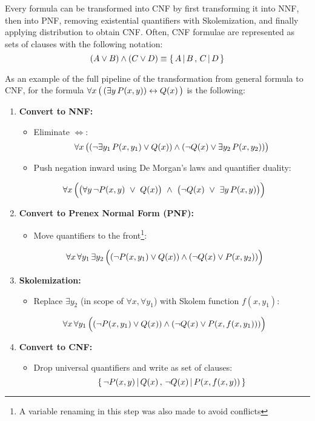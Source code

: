 Every formula can be transformed into CNF by first transforming it into NNF, then into PNF, removing existential quantifiers with Skolemization, and finally applying distribution to obtain CNF\@.
Often, CNF formulae are represented as sets of clauses with the following notation:
\[
(A \lor B) \land (C \lor D) \equiv \{\, A \,|\, B\,,\, C \,|\, D\,\}
\]

As an example of the full pipeline of the transformation from general formula to CNF, for the formula \( \forall x\,\big(\,(\exists y\, P(x,y)) \leftrightarrow Q(x)\,\big)\)
is the following:
\begin{enumerate}
    \item \textbf{Convert to NNF:}
    \begin{itemize}
        \item Eliminate \(\iff\):
          \[\forall x \,\big( (\neg \exists y_1\, P(x,y_1) \lor Q(x)) \land (\neg Q(x) \lor \exists y_2\, P(x,y_2))\big)\]
        \item Push negation inward using De Morgan's laws and quantifier duality:
    \end{itemize}
    \[
    \forall x\,\Big(\big(\forall y\,\neg P(x,y)\ \lor\ Q(x)\big)\ \land\ \big(\neg Q(x)\ \lor\ \exists y\, P(x,y)\big)\Big)
    \]
    
    \item \textbf{Convert to Prenex Normal Form (PNF):}
    \begin{itemize}
        \item Move quantifiers to the front\footnote{A variable renaming in this step was also made to avoid conflicts}:
    \end{itemize}
    \[
    \forall x\,\forall y_1\,\exists y_2\,
    \Big((\neg P(x,y_1)\lor Q(x)) \land (\neg Q(x)\lor P(x,y_2))\Big)
    \]
    
    \item \textbf{Skolemization:}
    \begin{itemize}
        \item Replace \(\exists y_2\) (in scope of \(\forall x,\forall y_1\)) with Skolem function \(f(x,y_1)\):
    \end{itemize}
    \[
    \forall x\,\forall y_1\,
    \Big((\neg P(x,y_1)\lor Q(x)) \land (\neg Q(x)\lor P(x,f(x,y_1)))\Big)
    \]
    
    \item \textbf{Convert to CNF:}
    \begin{itemize}
        \item Drop universal quantifiers and write as set of clauses:
        \[
          \{\,\neg P(x,y)\,|\, Q(x)\,,\,\neg Q(x)\,|\, P(x,f(x,y))\,\}
        \]
    \end{itemize}
    
\end{enumerate}


